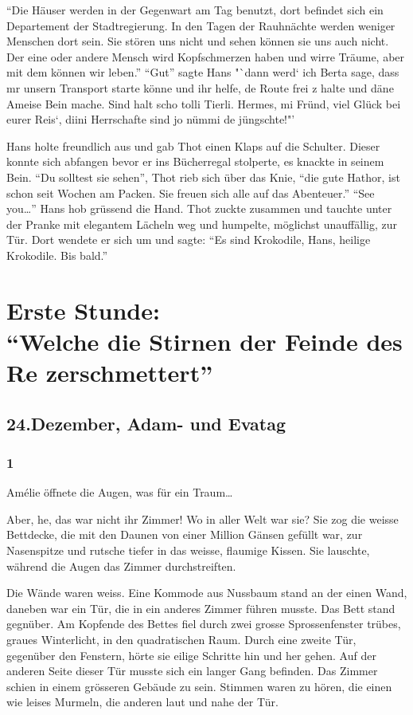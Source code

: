 \documentclass[11pt,titlepage,a5paper]{book}
\begin{document}
"`Die Häuser werden in der Gegenwart am Tag benutzt, dort befindet sich ein Departement der Stadtregierung. In den Tagen der Rauhnächte werden weniger Menschen dort sein. Sie stören uns nicht und sehen können sie uns auch nicht. Der eine oder andere Mensch wird Kopfschmerzen haben und wirre Träume, aber mit dem können wir leben."' "`Gut"' sagte Hans  "`dann werd` ich Berta sage, dass mr unsern Transport starte könne und ihr helfe, de Route frei z halte und däne Ameise Bein mache. Sind halt scho tolli Tierli. Hermes, mi Fründ, viel Glück bei eurer Reis`, diini Herrschafte sind jo nümmi de jüngschte!"'

Hans holte freundlich aus und gab Thot einen Klaps auf die Schulter. Dieser konnte sich abfangen bevor er ins Bücherregal stolperte, es knackte in seinem Bein. "`Du solltest sie sehen"', Thot rieb sich über das Knie, "`die gute Hathor, ist schon seit Wochen am Packen. Sie freuen sich alle auf das Abenteuer."' "`See you\dots"' Hans hob grüssend die Hand. Thot zuckte zusammen und tauchte unter der Pranke mit elegantem Lächeln weg und humpelte, möglichst unauffällig, zur Tür. Dort wendete er sich um und sagte: "`Es sind Krokodile, Hans, heilige Krokodile. Bis bald."'


\part*{Erste Stunde:\\"`Welche die Stirnen der Feinde des Re zerschmettert"'}


\chapter*{24.Dezember, Adam- und Evatag}

\section*{1}

Amélie öffnete die Augen, was für ein Traum\dots

Aber, he, das war nicht ihr Zimmer! Wo in aller Welt war sie? Sie zog die weisse Bettdecke, die mit den Daunen von einer Million Gänsen gefüllt war, zur Nasenspitze und rutsche tiefer in das weisse, flaumige Kissen. Sie lauschte, während die Augen das Zimmer durchstreiften. 

Die Wände waren weiss. Eine Kommode aus Nussbaum stand an der einen Wand, daneben war ein Tür, die in ein anderes Zimmer führen musste. Das Bett stand gegnüber. Am Kopfende des Bettes fiel durch zwei grosse Sprossenfenster trübes, graues Winterlicht, in den quadratischen Raum. Durch eine zweite Tür, gegenüber den Fenstern, hörte sie eilige Schritte hin und her gehen. Auf der anderen Seite dieser Tür musste sich ein langer Gang befinden. Das Zimmer schien in einem grösseren Gebäude zu sein. Stimmen waren zu hören, die einen wie leises Murmeln, die anderen laut und nahe der Tür.
\end{document}
